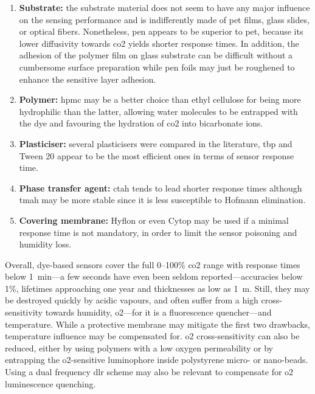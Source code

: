\begin{enumerate}[leftmargin=*,labelsep=4.9mm]
	\item	\textbf{Substrate:} the substrate material does not seem to have any major influence on the sensing performance and is indifferently made of \gls{pet} films, glass slides, or optical fibers. Nonetheless, \gls{pen} appears to be superior to \gls{pet}, because its lower diffusivity towards \gls{co2} yields shorter response times\cite{fritzsche2017}. In addition, the adhesion of the polymer film on glass substrate can be difficult without a cumbersome surface preparation\cite{cajlakovic2006, dansby2010} while \gls{pen} foils may just be roughened to enhance the sensitive layer adhesion\cite{fritzsche2017}.
	\item	\textbf{Polymer:} \gls{hpmc} may be a better choice than ethyl cellulose for being more hydrophilic than the latter, allowing water molecules to be entrapped with the dye and favouring the hydration of \gls{co2} into bicarbonate ions\cite{aguayolopez2014}.
	\item	\textbf{Plasticiser:} several plasticisers were compared in the literature, \gls{tbp} and Tween 20 appear to be the most efficient ones in terms of sensor response time\cite{wolfbeis1998, aguayolopez2014}.
	\item	\textbf{Phase transfer agent:} \gls{ctah} tends to lead shorter response times\cite{bultzingslowen2002} although \gls{tmah} may be more stable since it is less susceptible to Hofmann elimination\cite{aguayolopez2014}.
	\item	\textbf{Covering membrane:} Hyflon or even Cytop may be used if a minimal response time is not mandatory, in order to limit the sensor poisoning and humidity loss\cite{fritzsche2017}.
\end{enumerate}

Overall, dye-based sensors cover the full 0--100\% \gls{co2} range with response times below 1~min---a few seconds have even been seldom reported\cite{amao2005b, chu2008, chu2017}---accuracies below 1\%, lifetimes approaching one year\cite{fernandezramos2018, fernandezramos2019} and thicknesses as low as 1~\textmu{}m\cite{dansby2010}. Still, they may be destroyed quickly by acidic vapours, and often suffer from a high cross-sensitivity towards humidity, \gls{o2}---for it is a fluorescence quencher\cite{kautsky1939, lakowicz1973}---and temperature. While a protective membrane may mitigate the first two drawbacks, temperature influence may be compensated for. \gls{o2} cross-sensitivity can also be reduced, either by using polymers with a low oxygen permeability\cite{perez2009, fernandezramos2018} or by entrapping the \gls{o2}-sensitive luminophore inside polystyrene micro- or nano-beads\cite{huber2000, bultzingslowen2002, cajlakovic2006}. Using a dual frequency \gls{dlr} scheme may also be relevant to compensate for \gls{o2} luminescence quenching\cite{klimant2001_pap}.

